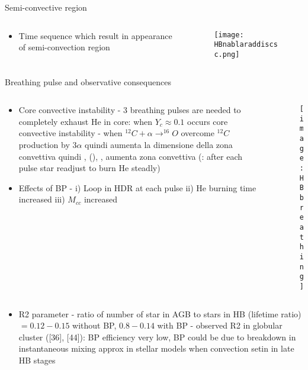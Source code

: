 \begin{frame}{Semi-convective region}
\begin{columns}[T]
\begin{column}{0.5\textwidth}
\begin{itemize}
\item Time sequence which result in appearance of semi-convection region
\end{itemize}
\end{column}
\begin{column}{0.5\textwidth}
\begin{figure}[!ht]
\texttt{[image: HBnablaraddiscsc.png]}\label{fig:HBnablaraddiscsc.png}
\end{figure}
\end{column}\end{columns}
\end{frame}

\begin{frame}{Breathing pulse and observative consequences}
\begin{columns}[T]
	\begin{column}{0.55\textwidth}
	\begin{itemize}
		\item Core convective instability - 3 breathing pulses are needed to completely exhaust He in core: when $Y_c\approx0.1$ occurs core convective instability - when $^{12}C+\alpha\to^{16}O$ overcome $^{12}C$ production by $3\alpha$ \xaumenta{\kappa} quindi aumenta la dimensione della zona convettiva quindi , (), \xaumenta{\nrad}, aumenta zona convettiva (: after each pulse star readjust to burn He steadly)
		\item Effects of BP - i) Loop in HDR at each pulse ii) He burning time increased iii) $M_{cc}$ increased
	\end{itemize}
	\end{column}
	\begin{column}{0.45\textwidth}
	\begin{figure}[!ht]
	\texttt{[image: HBbreathing]}\label{fig:HBbreathing}
	\end{figure}
\end{column}\end{columns}
	\begin{itemize}
	\item R2 parameter - ratio of number of star in AGB to stars in HB (lifetime ratio)  $=0.12-0.15$ without BP, $0.8-0.14$ with BP - observed R2 in globular cluster ([36], [44]): BP efficiency very low, BP could be due to breakdown in instantaneous mixing approx in stellar models when convection setin in late HB stages
\end{itemize}
\end{frame}

